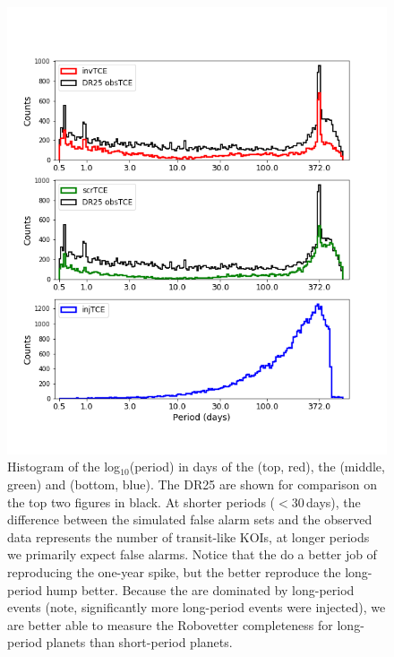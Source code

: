 \begin{figure}[htbp]
 \begin{center}
  \includegraphics[width=0.88\linewidth]{fig-simulTcePeriods.png}
  \caption{Histogram of the log$_{10}$(period) in days of the  (top, red), the  (middle, green) and  (bottom, blue). The DR25  are shown for comparison on the top two figures in black.  At shorter periods ($< 30$\,days), the difference between the simulated false alarm sets and the observed data represents the number of transit-like KOIs, at longer periods we primarily expect false alarms.  Notice that the  do a better job of reproducing the one-year spike, but the  better reproduce the long-period hump better. Because the  are dominated by long-period events (note, significantly more long-period events were injected), we are better able to measure the Robovetter completeness for long-period planets than short-period planets.}
  \label{f:simtces} 
 \end{center}
 \end{figure}



